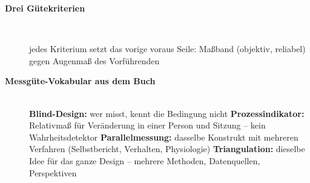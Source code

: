 \begin{description}
\item[{\rot\bf Drei Gütekriterien}]~\\[-\lblskip]
\begin{center}
\end{center}
\bi
  \ite jedes Kriterium setzt das vorige voraus
  \ite Seile: Maßband (objektiv, reliabel) gegen Augenmaß des Vorführenden
\ei
\os{\newpage}

\item[{\rot\bf Messgüte-Vokabular aus dem Buch}]~\\[-\lblskip]
\bi
  \ite \textbf{Blind-Design:} wer misst, kennt die Bedingung nicht
  \ite \textbf{Prozessindikator:} Relativmaß für Veränderung in einer
    Person und Sitzung -- kein Wahrheitsdetektor
  \ite \textbf{Parallelmessung:} dasselbe Konstrukt mit mehreren
    Verfahren (Selbstbericht, Verhalten, Physiologie)
  \ite \textbf{Triangulation:} dieselbe Idee für das ganze Design --
    mehrere Methoden, Datenquellen, Perspektiven
\ei
\os{\newpage}
\end{description}

